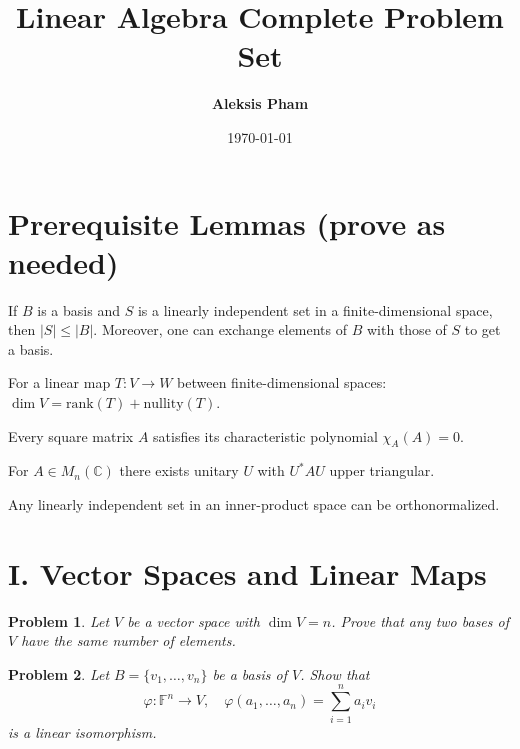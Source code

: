 \documentclass[11pt]{article}
\title{\textbf{Linear Algebra Complete Problem Set }}
\author{\textbf{Aleksis Pham} }
\date{\today}
\theoremstyle{upright}
\newtheorem{problem}{Problem}
\begin{document}
\maketitle

\section*{Prerequisite Lemmas (prove as needed)}
\begin{lemma}\label{lem:steinitz}
If $B$ is a basis and $S$ is a linearly independent set in a finite-dimensional space, then $|S|\le |B|$. Moreover, one can exchange elements of $B$ with those of $S$ to get a basis.
\end{lemma}

\begin{lemma}\label{lem:ranknull}
For a linear map $T:V\to W$ between finite-dimensional spaces: $\dim V=\mathrm{rank}(T)+\mathrm{nullity}(T)$.
\end{lemma}

\begin{lemma}\label{lem:CH}
Every square matrix $A$ satisfies its characteristic polynomial $\chi_A(A)=0$.
\end{lemma}

\begin{lemma}\label{lem:schur}
For $A\in M_n(\mathbb{C})$ there exists unitary $U$ with $U^*AU$ upper triangular.
\end{lemma}

\begin{lemma}\label{lem:GS}
Any linearly independent set in an inner-product space can be orthonormalized.
\end{lemma}



\section*{I. Vector Spaces and Linear Maps}

\begin{problem}
Let $V$ be a vector space with $\dim V=n$. Prove that any two bases of $V$ have the same number of elements.
\end{problem}

\begin{problem}
Let $B=\{v_1,\dots,v_n\}$ be a basis of $V$. Show that 
\[
\varphi:\mathbb{F}^n\to V,\quad \varphi(a_1,\dots,a_n)=\sum_{i=1}^n a_i v_i
\]
is a linear isomorphism.
\end{problem}
\end{document}
